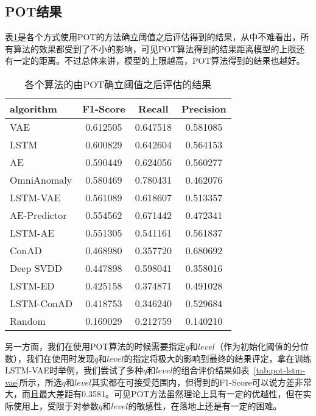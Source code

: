 \subsection{POT结果}
表\ref{tab:POT}是各个方式使用POT的方法确立阈值之后评估得到的结果，从中不难看出，所有算法的效果都受到了不小的影响，可见POT算法得到的结果距离模型的上限还有一定的距离。不过总体来讲，模型的上限越高，POT算法得到的结果也越好。

\begin{table}
  \centering
  \begin{tabular}{lccc}
    \toprule
            algorithm &  F1-Score &    Recall &  Precision \\
    \midrule
          VAE &  0.612505 &  0.647518 &   0.581085 \\
        LSTM &  0.600829 &  0.642604 &   0.564153 \\
                   AE &  0.590449 &  0.624056 &   0.560277 \\
          OmniAnomaly &  0.580469 &  0.780431 &   0.462076 \\
          LSTM-VAE &  0.561089 &  0.618607  & 0.513357 \\
         AE-Predictor &  0.554562 &  0.671442 &   0.472341 \\
             LSTM-AE &  0.551305 &  0.541161 &   0.561837 \\
                ConAD &  0.468980 &  0.357720 &   0.680692 \\
            Deep SVDD &  0.447898 &  0.598041 &   0.358016 \\
              LSTM-ED &  0.425158 &  0.374871 &   0.491028 \\
           LSTM-ConAD &  0.418753 &  0.346240 &   0.529684 \\
               Random &  0.169029 &  0.212759 &   0.140210 \\
    \bottomrule
    \end{tabular}
    \caption{各个算法的由POT确立阈值之后评估的结果}
    \label{tab:POT}
\end{table}

另一方面，我们在使用POT算法的时候需要指定$q$和$level$（作为初始化阈值的分位数），我们在使用时发现$q$和$level$的指定将极大的影响到最终的结果评定，拿在训练LSTM-VAE时举例，我们尝试了多种$q$和$level$的组合评价结果如表~\ref{tab:pot-lstm-vae}所示，所选$q$和$level$其实都在可接受范围内，但得到的F1-Score可以说方差非常大，而且最大差距有0.3581。可见POT方法虽然理论上具有一定的优越性，但在实际使用上，受限于对参数$q$和$level$的敏感性，在落地上还是有一定的困难。

